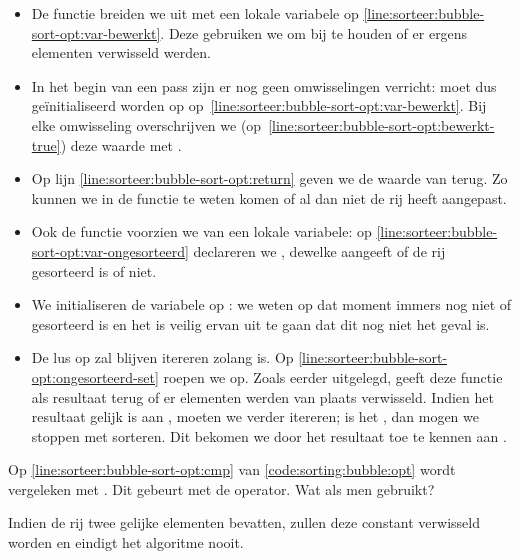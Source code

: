 \begin{itemize}
  \item De functie  breiden we uit met een lokale variabele
         op \cref{line:sorteer:bubble-sort-opt:var-bewerkt}.
        Deze gebruiken we om bij te houden of er ergens elementen verwisseld werden.
  \item In het begin van een pass zijn er nog geen omwisselingen verricht:
         moet dus ge\"initialiseerd worden op 
        op~\cref{line:sorteer:bubble-sort-opt:var-bewerkt}.
        Bij elke omwisseling overschrijven we (op~\cref{line:sorteer:bubble-sort-opt:bewerkt-true})
        deze waarde met . 
  \item Op lijn \cref{line:sorteer:bubble-sort-opt:return} geven we de waarde
        van  terug. Zo kunnen we in de functie 
        te weten komen of  al dan niet de rij heeft aangepast.
  \item Ook de functie  voorzien we van een lokale variabele:
        op \cref{line:sorteer:bubble-sort-opt:var-ongesorteerd} declareren
        we , dewelke aangeeft of de rij gesorteerd is of niet.
  \item We initialiseren de variabele  op :
        we weten op dat moment immers nog niet of  gesorteerd is
        en het is veilig ervan uit te gaan dat dit nog niet het geval is.
  \item De lus op 
        zal blijven itereren zolang   is.
        Op \cref{line:sorteer:bubble-sort-opt:ongesorteerd-set} roepen we 
        op. Zoals eerder uitgelegd, geeft deze functie als resultaat terug of er elementen werden van
        plaats verwisseld. Indien het resultaat gelijk is aan ,
        moeten we verder itereren; is het , dan mogen we stoppen met sorteren.
        Dit bekomen we door het resultaat toe te kennen aan .
\end{itemize}

\begin{exercise}
Op \cref{line:sorteer:bubble-sort-opt:cmp} van \cref{code:sorting:bubble:opt}
wordt  vergeleken met . Dit gebeurt
met de \inlinecode{>} operator. Wat als men \inlinecode{>=} gebruikt?
\begin{solution}
Indien de rij twee gelijke elementen bevatten, zullen deze constant verwisseld
worden en eindigt het algoritme nooit.
\end{solution}
\end{exercise}

